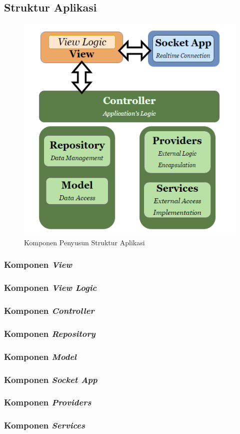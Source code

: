 
\subsection{Struktur Aplikasi}
\label{software-structure}

	\begin{figure}[H]
		\centering
		\includegraphics[width=.7\textwidth]{images/bab3/apl/main-apl.png}
		\caption{Komponen Penyusun Struktur Aplikasi}
		\label{software-structure-img}
	\end{figure}
	
	\subsubsection{Komponen \textit{View}}
	\subsubsection{Komponen \textit{View Logic}}
	\subsubsection{Komponen \textit{Controller}}
	\subsubsection{Komponen \textit{Repository}}
	\subsubsection{Komponen \textit{Model}}
	\subsubsection{Komponen \textit{Socket App}}
	\subsubsection{Komponen \textit{Providers}}
	\subsubsection{Komponen \textit{Services}}
	\newpage
	

	
	
	